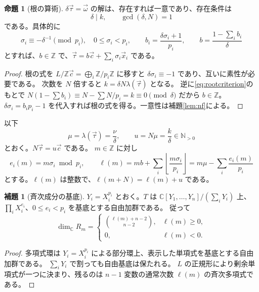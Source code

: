 \documentclass[11pt,a4paper]{ltjsarticle}
\numberwithin{equation}{section}
\theoremstyle{definition}
\newtheorem{proposition}[theorem]{命題}
\newtheorem{lemma}[theorem]{補題}
\newcommand{\Z}{\mathbb Z}\newcommand{\N}{\mathbb N}\newcommand{\Q}{\mathbb Q}\newcommand{\C}{\mathbb C}
\newcommand{\cc}{\vec c}\newcommand{\xx}{\vec x}\newcommand{\om}{\vec\omega}\newcommand{\ta}{\vec\tau}
\begin{document}
\begin{proposition}[根の算術]\label{prop:root}
$\delta\ta=\om$ の解は、存在すれば一意であり、存在条件は
\begin{equation}\label{eq:rootcriterion}
 \delta\mid k,\qquad\gcd(\delta,N)=1
\end{equation}
である。具体的に
\[
 \sigma_i\equiv-\delta^{-1}\pmod{p_i},\quad0\le\sigma_i<p_i,
 \qquad b_i=\frac{\delta\sigma_i+1}{p_i},\qquad
 b=\frac{1-\sum_i b_i}{\delta}
\]
とすれば、$b\in\Z$ で、$\ta=b\cc+\sum_i\sigma_i\xx_i$ である。
\end{proposition}
\begin{proof}
根の式を $L/\Z\cc=\bigoplus_i\Z/p_i\Z$ に移すと $\delta\sigma_i\equiv-1$ であり、互いに素性が必要である。
次数を $N$ 倍すると $k=\delta N\lambda(\ta)$ となる。
逆に\eqref{eq:rootcriterion}のもとで
$N(1-\sum b_i)\equiv N-\sum N/p_i=k\equiv0\pmod\delta$ だから $b\in\Z$。
$\delta\sigma_i=b_ip_i-1$ を代入すれば根の式を得る。一意性は補題\ref{lem:nf}による。
\end{proof}
以下
\begin{equation}\label{eq:u}
 \mu=\lambda(\ta)=\frac\nu\delta,\qquad u=N\mu=\frac k\delta\in\N_{>0}
\end{equation}
とおく。$N\ta=u\cc$ である。
$m\in\Z$ に対し
\begin{equation}\label{eq:ell}
 e_i(m)=m\sigma_i\bmod p_i,\qquad
 \ell(m)=mb+\sum_i\left\lfloor\frac{m\sigma_i}{p_i}\right\rfloor
 =m\mu-\sum_i\frac{e_i(m)}{p_i}
\end{equation}
とする。$\ell(m)$ は整数で、$\ell(m+N)=\ell(m)+u$ である。

\begin{lemma}[斉次成分の基底]\label{lem:pieces}
$Y_i=X_i^{p_i}$ とおく。$T$ は
$\C[Y_1,\dots,Y_n]/(\sum_iY_i)$ 上、$\prod_iX_i^{e_i}$、$0\le e_i<p_i$ を基底とする自由加群である。
従って
\begin{equation}\label{eq:hilbertpieces}
 \dim_\C R_m=
 \begin{cases}\displaystyle\binom{\ell(m)+n-2}{n-2},&\ell(m)\ge0,\\0,&\ell(m)<0.\end{cases}
\end{equation}
\end{lemma}
\begin{proof}
多項式環は $Y_i=X_i^{p_i}$ による部分環上、表示した単項式を基底とする自由加群である。
$\sum_iY_i$ で割っても自由基底は保たれる。
$L$ の正規形により剰余単項式が一つに決まり、残るのは $n-1$ 変数の通常次数 $\ell(m)$ の斉次多項式である。
\end{proof}
\end{document}
